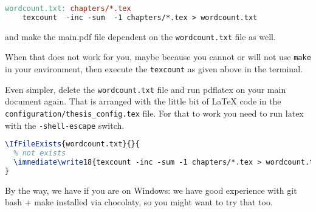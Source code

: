 \begin{lstlisting}[language=make,showtabs]
wordcount.txt: chapters/*.tex
	texcount  -inc -sum  -1 chapters/*.tex > wordcount.txt
\end{lstlisting}

and make the main.pdf file dependent on the \texttt{wordcount.txt} file as
well.

When that does not work for you, maybe because you cannot or will not
use \texttt{make} in your environment, then execute the
\texttt{texcount} as given above in the terminal.

Even simpler, delete the \texttt{wordcount.txt} file and run pdflatex
on your main document again. That is arranged with the little bit of
\LaTeX{} code in the \texttt{configuration/thesis\_config.tex} file.
For that to work you need to run latex with the \texttt{-shell-escape} switch.

\begin{lstlisting}[language=TeX,emph={wordcount,txt},emphstyle={\colorbox{Yellow}},morekeywords={begin,end}]
\IfFileExists{wordcount.txt}{}{
  % not exists
  \immediate\write18{texcount -inc -sum -1 chapters/*.tex > wordcount.txt}
}

\end{lstlisting}



By the way, we have if you are on Windows: we have good experience
with git bash + make installed via chocolaty, so you might want to try
that too.
